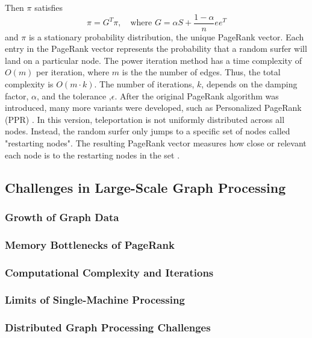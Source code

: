 Then $\pi$ satisfies 
\begin{equation}
    \pi=G^T\pi, \quad \text{where $G=\alpha S +\frac{1-\alpha}{n}ee^T$}
\end{equation}
and $\pi$ is a stationary probability distribution, the unique PageRank vector.
Each entry in the PageRank vector represents the probability that a random surfer will land on a particular node. The power iteration method has a time complexity of $O(m)$ per iteration, where $m$ is the the number of edges. Thus, the total complexity is $O(m\cdot k)$. The number of iterations, $k$, depends on the damping factor, $\alpha$, and the tolerance ,$\epsilon$. After the original PageRank algorithm was introduced, many more variants were developed, such as Personalized PageRank (PPR) \cite{park_survey_2019}.
In this version, teleportation is not uniformly distributed across all nodes. Instead, the random surfer only jumps to a specific set of nodes called  "restarting nodes". The resulting PageRank vector measures how close or relevant each node is to the restarting nodes in the set \cite{priyanta_social_2019}. 

 
\subsection{Challenges in Large-Scale Graph Processing}

\subsubsection{Growth of Graph Data}
\subsubsection{Memory Bottlenecks of PageRank}
\subsubsection{Computational Complexity and Iterations}
\subsubsection{Limits of Single-Machine Processing}
\subsubsection{Distributed Graph Processing Challenges}

